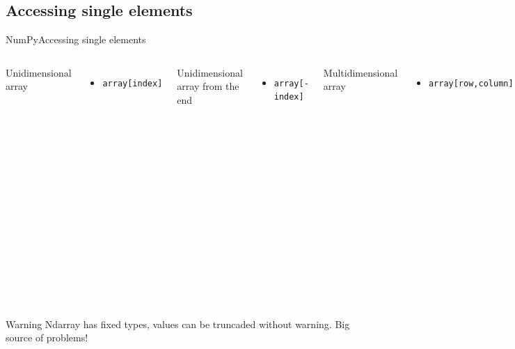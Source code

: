 \documentclass[10pt,compress]{beamer} %
\begin{document}
\subsection{Accessing single elements}
\begin{frame}[fragile]{NumPy}{Accessing single elements}
	\begin{columns}
		Unidimensional array
		\begin{itemize}
			\item \texttt{array[index]}
		\end{itemize}
		Unidimensional array from the end
		\begin{itemize}
			\item \texttt{array[-index]}
		\end{itemize}
		Multidimensional array
		\begin{itemize}
			\item \texttt{array[row,column]}
		\end{itemize}

		\begin{exampleblock}{}
		\vspace{-0.2cm} 
			\begin{lstlisting}
x = np.array([5, 0, 3, 3, 7, 9])
x[0] # 5
x[4] # 7
x[-1] # 9
x[-2] # 7
x = np.array([[3, 5, 2, 4],
    [7, 6, 8, 8],
    [1, 6, 7, 7]])
x2[2, 0] # 1 
x2[2, -1] # 7
			\end{lstlisting}
		\vspace{-0.2cm} 
		\end{exampleblock}
	\end{columns}

	\smallskip

	\begin{columns}
 	   \column{0.6\textwidth}
		\begin{alertblock}{Warning}
			Ndarray has fixed types, values can be truncaded without warning. Big source of problems!
		\end{alertblock}
	\end{columns}

\end{frame}
\end{document}
